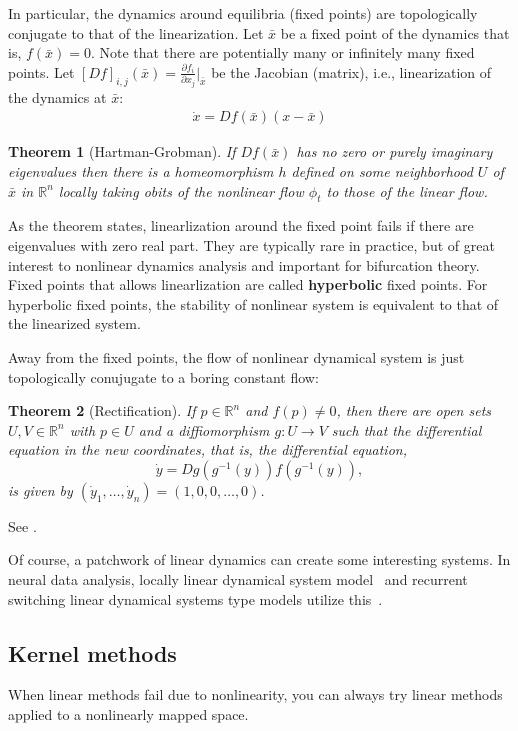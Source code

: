 \documentclass[a4paper,11pt]{exam}
\newtheorem{theorem}{Theorem}
\newcounter{ct}
\newcommand{\inv}{^{-1}}
\newcommand{\field}[1]{\ensuremath{\mathbb{#1}}}
\newcommand{\reals}{\field{R}}
\begin{document}
In particular, the dynamics around equilibria (fixed points) are topologically conjugate to that of the linearization.
Let $\bar{x}$ be a fixed point of the dynamics that is, $f(\bar{x}) = 0$.
Note that there are potentially many or infinitely many fixed points.
Let $[Df]_{i,j}(\bar{x}) = \frac{\partial f_i}{\partial x_j}\bigr\rvert_{\bar{x}}$ be the Jacobian (matrix), i.e., linearization of the dynamics at $\bar{x}$:
\begin{align}\label{eq:linearized_around_FP}
    \dot{x} = Df(\bar{x}) (x - \bar{x})
\end{align}


\begin{theorem}[Hartman-Grobman]
    If $Df(\bar{x})$ has no zero or purely imaginary eigenvalues then there is a homeomorphism $h$ defined on some neighborhood $U$ of $\bar{x}$ in $\reals^n$ locally taking obits of the nonlinear flow $\phi_t$ to those of the linear flow.
\end{theorem}
As the theorem states, linearlization around the fixed point fails if there are eigenvalues with zero real part.
They are typically rare in practice, but of great interest to nonlinear dynamics analysis and important for bifurcation theory.
Fixed points that allows linearlization are called \textbf{hyperbolic} fixed points.
For hyperbolic fixed points, the stability of nonlinear system is equivalent to that of the linearized system.

Away from the fixed points, the flow of nonlinear dynamical system is just topologically conujugate to a boring constant flow:
\begin{theorem}[Rectification]
    If $p \in \reals^n$ and $f(p) \neq 0$, then there are open sets $U, V \in \reals^n$ with $p \in U$ and a diffiomorphism $g: U \to V$ such that the differential equation in the new coordinates, that is, the differential equation,
    $$ \dot{y} = Dg(g\inv(y)) f(g\inv(y)), $$
is given by $(\dot{y}_1, \ldots, \dot{y}_n) = (1, 0, 0, \ldots, 0)$.
\end{theorem}
See \citet[Lemma 1.120]{Chicone2006}.

Of course, a patchwork of linear dynamics can create some interesting systems.
In neural data analysis, locally linear dynamical system model~\cite{Zhao2016d} and recurrent switching linear dynamical systems type models utilize this~\citep{Linderman2017,Nassar2018b}.

\subsection{Kernel methods}
When linear methods fail due to nonlinearity, you can always try linear methods applied to a nonlinearly mapped space.
\end{document}
